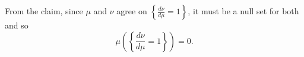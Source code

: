 \documentclass[12pt]{Qual}
\begin{document}
\begin{solution}
From the claim, since $\mu$ and $\nu$ agree on $\left\{\frac{d\nu}{d\mu}=1\right\}$, it must be a null set for both and so  $$\mu\left(\left\{\frac{d\nu}{d\mu}=1\right\}\right)=0.$$

\begin{comment}
b/c $\nu<<\mu-\nu$ and $\mu-\nu<<\mu$, we have that $$f=\frac{d\nu}{d\mu}=\frac{d\nu}{d(\mu-\nu)}\frac{d(\mu-\nu)}{d\mu}=\frac{d\nu}{d(\mu-\nu)}\left(1-\frac{d\nu}{d\mu}\right)=\frac{d\nu}{d(\mu-\nu)}(1-f).$$

Now, $$(\mu-\nu)(E)=\int_Ed(\mu-\nu)=\int_E\frac{d(\mu-\nu)}{d\mu}d\mu\implies \frac{d(\mu-\nu)}{d\mu}>0$$ since $\mu-\nu$ is a positive measure. Furthermore, $$\int_Ed(\mu-\nu)=(\mu-\nu)(E)\le\mu(E)=\int_Ed\mu\implies \frac{d(\mu-\nu)}{d\mu}\le 1.$$ Since we already used that $$\frac{d(\mu-\nu)}{d\mu}=\frac{d\mu}{d\mu}-\frac{d\nu}{d\mu}=1-f$$ we have then that $$0<1-f\le 1\implies -1<-f\le 0\implies 0\le f<1.$$

Thus, $$\frac{d\nu}{d\mu}=f<1\qquad\mu\text{-a.e.}$$ and so  $$\mu\left(\left\{\frac{d\nu}{d\mu}=1\right\}\right)=0.$$
\end{comment}

\end{solution}
\vspace{0.5cm}
\end{document}
